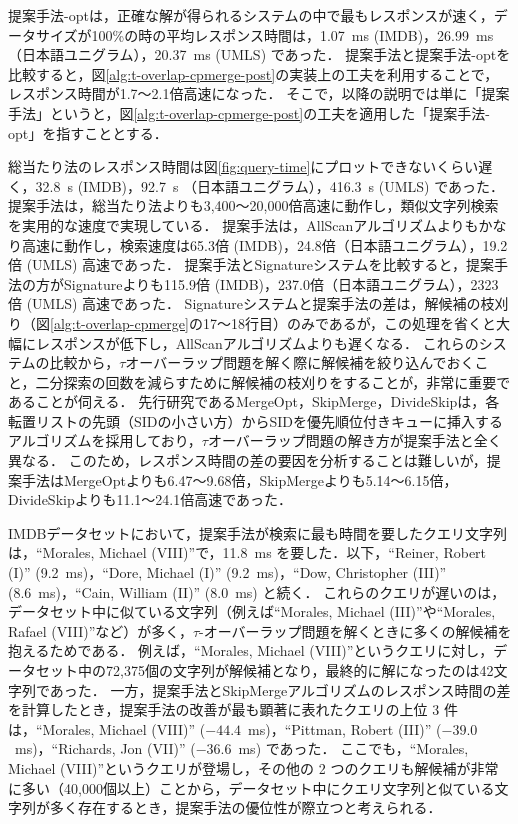 \documentclass[japanese]{jnlp_JS2.0}
\begin{document}
提案手法-optは，正確な解が得られるシステムの中で最もレスポンスが速く，データサイズが100\%の時の平均レスポンス時間は，1.07~ms (IMDB)，26.99~ms（日本語ユニグラム），20.37~ms (UMLS) であった．
提案手法と提案手法-optを比較すると，図\ref{alg:t-overlap-cpmerge-post}の実装上の工夫を利用することで，レスポンス時間が1.7〜2.1倍高速になった．
そこで，以降の説明では単に「提案手法」というと，図\ref{alg:t-overlap-cpmerge-post}の工夫を適用した「提案手法-opt」を指すこととする．

総当たり法のレスポンス時間は図\ref{fig:query-time}にプロットできないくらい遅く，32.8~s (IMDB)，92.7~s （日本語ユニグラム），416.3~s (UMLS) であった．
提案手法は，総当たり法よりも3,400〜20,000倍高速に動作し，類似文字列検索を実用的な速度で実現している．
提案手法は，AllScanアルゴリズムよりもかなり高速に動作し，検索速度は65.3倍 (IMDB)，24.8倍（日本語ユニグラム），19.2倍 (UMLS) 高速であった．
提案手法とSignatureシステムを比較すると，提案手法の方がSignatureよりも115.9倍 (IMDB)，237.0倍（日本語ユニグラム），2323倍 (UMLS) 高速であった．
Signatureシステムと提案手法の差は，解候補の枝刈り（図\ref{alg:t-overlap-cpmerge}の17〜18行目）のみであるが，この処理を省くと大幅にレスポンスが低下し，AllScanアルゴリズムよりも遅くなる．
これらのシステムの比較から，$\tau$オーバーラップ問題を解く際に解候補を絞り込んでおくこと，二分探索の回数を減らすために解候補の枝刈りをすることが，非常に重要であることが伺える．
先行研究であるMergeOpt，SkipMerge，DivideSkipは，各転置リストの先頭（SIDの小さい方）からSIDを優先順位付きキューに挿入するアルゴリズムを採用しており，$\tau$オーバーラップ問題の解き方が提案手法と全く異なる．
このため，レスポンス時間の差の要因を分析することは難しいが，提案手法はMergeOptよりも6.47〜9.68倍，SkipMergeよりも5.14〜6.15倍，DivideSkipよりも11.1〜24.1倍高速であった．

IMDBデータセットにおいて，提案手法が検索に最も時間を要したクエリ文字列は，``Morales, Michael (VIII)''で，11.8~ms を要した．以下，``Reiner, Robert (I)'' (9.2~ms)，``Dore, Michael (I)'' (9.2~ms)，``Dow, Christopher (III)'' (8.6~ms)，``Cain, William (II)'' (8.0~ms) と続く．
これらのクエリが遅いのは，データセット中に似ている文字列（例えば``Morales, Michael (III)''や``Morales, Rafael (VIII)''など）が多く，$\tau$-オーバーラップ問題を解くときに多くの解候補を抱えるためである．
例えば，``Morales, Michael (VIII)''というクエリに対し，データセット中の72,375個の文字列が解候補となり，最終的に解になったのは42文字列であった．
一方，提案手法とSkipMergeアルゴリズムのレスポンス時間の差を計算したとき，提案手法の改善が最も顕著に表れたクエリの上位 3 件は，``Morales, Michael (VIII)'' ($-44.4$~ms)，``Pittman, Robert (III)'' ($-39.0$~ms)，``Richards, Jon (VII)'' ($-36.6$~ms) であった．
ここでも，``Morales, Michael (VIII)''というクエリが登場し，その他の 2 つのクエリも解候補が非常に多い（40,000個以上）ことから，データセット中にクエリ文字列と似ている文字列が多く存在するとき，提案手法の優位性が際立つと考えられる．
\end{document}
